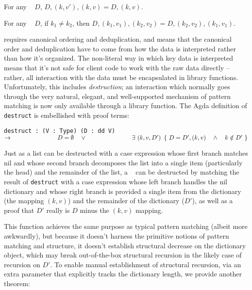 
\begin{theorem}
\label{thm:cont-dicts}

\breakAndIndent
%
For any {\dd}~ $D$,
%
$D, (k, v'), (k, v) = D, (k, v)$.

\end{theorem}

\begin{theorem}
\label{thm:exch-dicts}

\breakAndIndent
%
For any {\dd}~ $D$,
%
if $k_1 \ne k_2$, then
%
$D, (k_1, v_1), (k_2, v_2) = D, (k_2, v_2), (k_1, v_1)$.

\end{theorem}


\SemInj{} requires canonical ordering and deduplication, and \SemTot{} means that the canonical order and deduplication have to come from
how the data is interpreted rather than how it's organized. The non-literal way in which key data is interpreted means that it's not
safe for client code to work with the raw data directly -- rather, all interaction with the data must be
encapsulated in library functions. Unfortunately, this includes \emph{destruction}; an interaction which
normally goes through the very natural, elegant, and well-supported mechanism of pattern matching is now
only available through a library function. The Agda definition of \verb+destruct+ is embellished with proof terms:

\texttt{destruct : (V : Type) (D : dd V) $\rightarrow \\
\phantom{xxxxxxxxxxxxx} D = \emptyset \quad \lor \\
\phantom{xxxxxxxxxxxxx} \exists~(k, v, D')~\left\{~ D = D' , (k, v) \quad \land \quad k \notin D' ~\right\}$}

Just as a list can be destructed with a case expression whose first branch matches nil and whose second branch
decomposes the list into a single item (particularly the head) and the remainder of the list, a \dd~ can be
destructed by matching the result of \verb+destruct+ with a case expression whose left branch handles the
nil dictionary and whose right branch is provided a single item from the dictionary (the mapping $(k, v)$)
and the remainder of the dictionary ($D'$), as well as a proof that $D'$ really is $D$ minus the $(k, v)$
mapping.

This function achieves the same purpose as typical pattern matching (albeit more awkwardly), but because it
doesn't harness the primitive notions of pattern matching and structure, it doesn't establish structural
decrease on the dictionary object, which may break out-of-the-box structural recursion in the likely case
of recursion on $D'$. To enable manual establishment of structural recursion, via an extra parameter that
explicitly tracks the dictionary length, we provide another theorem:

